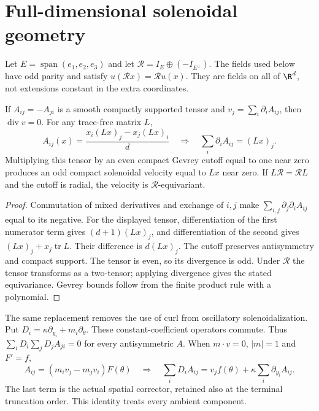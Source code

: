\section{Full-dimensional solenoidal geometry}
Let $E=\operatorname{span}(e_1,e_2,e_3)$ and let
$\mathcal R=I_E\oplus(-I_{E^\perp})$. The fields used below have odd
parity and satisfy $u(\mathcal R x)=\mathcal R u(x)$.
They are fields on all of $\R^d$, not extensions constant in the extra
coordinates.

\begin{lemma}\label{lem:potential}
If $A_{ij}=-A_{ji}$ is a smooth compactly supported tensor and
$v_j=\sum_i\partial_iA_{ij}$, then $\operatorname{div}v=0$.
For any trace-free matrix $L$,
\[
 A_{ij}(x)=\frac{x_i(Lx)_j-x_j(Lx)_i}{d}
 \quad\Longrightarrow\quad \sum_i\partial_i A_{ij}=(Lx)_j.
\]
Multiplying this tensor by an even compact Gevrey cutoff equal to one
near zero produces an odd compact solenoidal velocity equal to $Lx$
near zero. If $L\mathcal R=\mathcal R L$ and the cutoff is radial, the
velocity is $\mathcal R$-equivariant.
\end{lemma}
\begin{proof}
Commutation of mixed derivatives and exchange of $i,j$ make
$\sum_{i,j}\partial_j\partial_iA_{ij}$ equal to its negative.
For the displayed tensor, differentiation of the first numerator term
gives $(d+1)(Lx)_j$, and differentiation of the second gives
$(Lx)_j+x_j\operatorname{tr}L$. Their difference is $d(Lx)_j$.
The cutoff preserves antisymmetry and compact support. The tensor is
even, so its divergence is odd. Under $\mathcal R$ the tensor transforms
as a two-tensor; applying divergence gives the stated equivariance.
Gevrey bounds follow from the finite product rule with a polynomial.
\end{proof}

The same replacement removes the use of curl from oscillatory
solenoidalization. Put $D_i=\kappa\partial_{y_i}+m_i\partial_\theta$.
These constant-coefficient operators commute. Thus
$\sum_iD_i\sum_jD_j A_{ji}=0$ for every antisymmetric $A$.
When $m\cdot v=0$, $|m|=1$ and $F'=f$,
\[
 A_{ij}=(m_i v_j-m_j v_i)F(\theta)
 \quad\Longrightarrow\quad
 \sum_iD_i A_{ij}=v_jf(\theta)+\kappa\sum_i\partial_{y_i}A_{ij}.
\]
The last term is the actual spatial corrector, retained also at the
terminal truncation order. This identity treats every ambient component.

